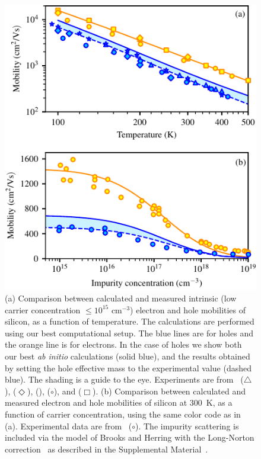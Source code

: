 \documentclass[aps,prl,twocolumn,superscriptaddress]{revtex4-1}
\begin{document}
\begin{figure}
  \centering
  \includegraphics[width=\columnwidth]{fig3.pdf}
  \caption{\label{fig3}
  (a) Comparison between calculated and measured intrinsic (low carrier concentration $\leq 10^{15}$ cm$^{-3}$) electron and hole mobilities of silicon,
  as a function of temperature. The calculations are performed using our best computational setup.
  The blue lines are for holes and the orange line is for electrons. In the case of holes we show
  both our best {\it ab initio} calculations (solid blue), and the results obtained by setting the
  hole effective mass to the experimental value (dashed blue). The shading is a guide to the eye.
  Experiments are from~\cite{Morin1954} ($\triangle$), \cite{Logan1960} ($\Diamond$),
  \cite{Ludwig1956} (), \cite{Jacoboni1977} ($\circ$), and \cite{Norton1973} ($\Box$).
  (b) Comparison between calculated and measured electron and hole mobilities of silicon at 300~K, 
  as a function of carrier concentration, using the same color code as in (a). 
  Experimental data are from~\cite{Jacoboni1977} ($\circ$).
  The impurity scattering is included via the model of Brooks and Herring with the Long-Norton correction~\cite{Brooks1951,Li1977} as described in the Supplemental Material~\cite{SI}.
  }
\end{figure}
\end{document}
